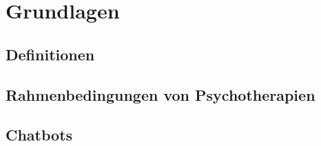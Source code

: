 
\chapter{Grundlagen}
\label{ch:Background}

\section{Definitionen}

\section{Rahmenbedingungen von Psychotherapien}

\section{Chatbots}